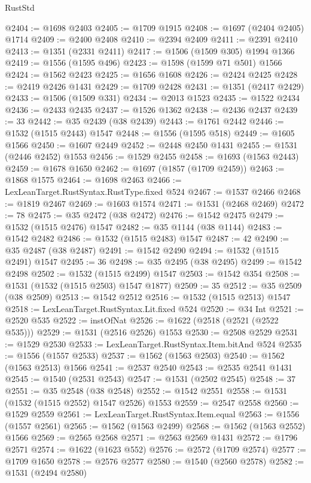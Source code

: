 \begin{lexlean}{RustStd}
\begin{coremodule}
{\begin{coremodule}
{{{{{{{{{{{{{{{{{{{{{{{{{{{{{{{{@2404 := @1698 @2403
@2405 := @1709 @1915
@2408 := @1697 (@2404 @2405) @1714
@2409 := @2400 @2408
@2410 := @2394 @2409
@2411 := @2391 @2410
@2413 := @1351 (@2331 @2411)
@2417 := @1506 (@1509 @305) @1994 @1366
@2419 := @1556 (@1595 @496)
@2423 := @1598 (@1599 @71 @501) @1566
@2424 := @1562 @2423
@2425 := @1656 @1608
@2426 := @2424 @2425
@2428 := @2419 @2426 @1431
@2429 := @1709 @2428
@2431 := @1351 (@2417 @2429)
@2433 := @1506 (@1509 @331)
@2434 := @2013 @1523
@2435 := @1522 @2434
@2436 := @2433 @2435
@2437 := @1526 @1362
@2438 := @2436 @2437
@2439 := 33
@2442 := @35 @2439 (@38 @2439)
@2443 := @1761 @2442
@2446 := @1532 (@1515 @2443) @1547
@2448 := @1556 (@1595 @518)
@2449 := @1605 @1566
@2450 := @1607 @2449
@2452 := @2448 @2450 @1431
@2455 := @1531 (@2446 @2452) @1553
@2456 := @1529 @2455
@2458 := @1693 (@1563 @2443)
@2459 := @1678 @1650
@2462 := @1697 (@1857 (@1709 @2459))
@2463 := @1868 @1575
@2464 := @1698 @2463
@2466 := LexLeanTarget.RustSyntax.RustType.fixed @524
@2467 := @1537 @2466
@2468 := @1819 @2467
@2469 := @1603 @1574
@2471 := @1531 (@2468 @2469)
@2472 := 78
@2475 := @35 @2472 (@38 @2472)
@2476 := @1542 @2475
@2479 := @1532 (@1515 @2476) @1547
@2482 := @35 @1144 (@38 @1144)
@2483 := @1542 @2482
@2486 := @1532 (@1515 @2483) @1547
@2487 := 42
@2490 := @35 @2487 (@38 @2487)
@2491 := @1542 @2490
@2494 := @1532 (@1515 @2491) @1547
@2495 := 36
@2498 := @35 @2495 (@38 @2495)
@2499 := @1542 @2498
@2502 := @1532 (@1515 @2499) @1547
@2503 := @1542 @354
@2508 := @1531 (@1532 (@1515 @2503) @1547 @1877)
@2509 := 35
@2512 := @35 @2509 (@38 @2509)
@2513 := @1542 @2512
@2516 := @1532 (@1515 @2513) @1547
@2518 := LexLeanTarget.RustSyntax.Lit.fixed @524
@2520 := @34 Int
@2521 := @2520 @535
@2522 := instOfNat
@2526 := @1622 (@2518 (@2521 (@2522 @535)))
@2529 := @1531 (@2516 @2526) @1553
@2530 := @2508 @2529
@2531 := @1529 @2530
@2533 := LexLeanTarget.RustSyntax.Item.bitAnd @524
@2535 := @1556 (@1557 @2533)
@2537 := @1562 (@1563 @2503)
@2540 := @1562 (@1563 @2513) @1566
@2541 := @2537 @2540
@2543 := @2535 @2541 @1431
@2545 := @1540 (@2531 @2543)
@2547 := @1531 (@2502 @2545)
@2548 := 37
@2551 := @35 @2548 (@38 @2548)
@2552 := @1542 @2551
@2558 := @1531 (@1532 (@1515 @2552) @1547 @2526) @1553
@2559 := @2547 @2558
@2560 := @1529 @2559
@2561 := LexLeanTarget.RustSyntax.Item.equal
@2563 := @1556 (@1557 @2561)
@2565 := @1562 (@1563 @2499)
@2568 := @1562 (@1563 @2552) @1566
@2569 := @2565 @2568
@2571 := @2563 @2569 @1431
@2572 := @1796 @2571
@2574 := @1622 (@1623 @552)
@2576 := @2572 (@1709 @2574)
@2577 := @1709 @1650
@2578 := @2576 @2577
@2580 := @1540 (@2560 @2578)
@2582 := @1531 (@2494 @2580)
}}}}}}}}}}}}}}}}}}}}}}}}}}}}}}}}
\end{coremodule}}
\end{coremodule}
\end{lexlean}
